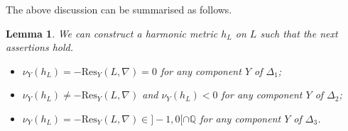 \documentclass[english]{amsart}
\newcommand{\Res}{\mathrm{Res}}
\newtheorem{lemme}[thm]{Lemma}
\newtheorem{proposition}[thm]{Proposition}
\newtheorem{remark}[thm]{Remark}
\numberwithin{equation}{thm}
\begin{document}
	






\medskip

The above discussion can be summarised as follows.
\begin{lemme}\label{choicemetric} We can construct a harmonic metric $h_L$ on $L$ such that the next assertions hold.
	\begin{itemize}
		\item $\nu_{Y}(h_L) = -\Res_{Y}(L,\nabla) = 0$ for any component $Y$ of $\Delta_1$;
		\item $\nu_{Y}(h_L) \neq -\Res_{Y}(L,\nabla)$ and $\nu_{Y}(h_L) < 0$ for any component $Y$ of $\Delta_2$;
		\item $\nu_Y(h_L) = -\Res_Y(L,\nabla) \in ]-1,0[ \cap \mathbb Q$ for any component $Y$ of $\Delta_3$.
	\end{itemize}
\end{lemme}
\end{document}
